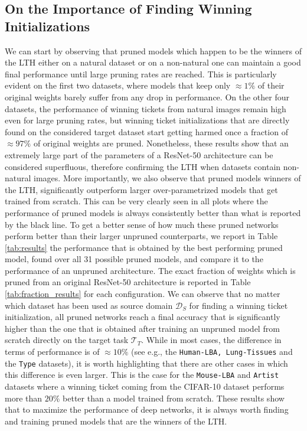 \subsection{On the Importance of Finding Winning Initializations}
We can start by observing that pruned models which happen to be the winners of the LTH either on a natural dataset or on a non-natural one can maintain a good final performance until large pruning rates are reached. This is particularly evident on the first two datasets, where models that keep only $\approx 1\%$ of their original weights barely suffer from any drop in performance. %
On the other four datasets, the performance of winning tickets from natural images remain high even for large pruning rates, but winning ticket initializations that are directly found on the considered target dataset start getting harmed once a fraction of $\approx 97\%$ of original weights are pruned. Nonetheless, these results show that an extremely large part of the parameters of a ResNet-50 architecture can be considered superfluous, therefore confirming the LTH when datasets contain non-natural images. More importantly, we also observe that pruned models winners of the LTH, significantly outperform larger over-parametrized models that get trained from scratch. This can be very clearly seen in all plots where the performance of pruned models is always consistently better than what is reported by the black line. To get a better sense of how much these pruned networks perform better than their larger unpruned counterparts, we report in Table \ref{tab:results} the performance that is obtained by the best performing pruned model, found over all 31 possible pruned models, and compare it to the performance of an unpruned architecture. The exact fraction of weights which is pruned from an original ResNet-50 architecture is reported in Table \ref{tab:fraction_results} for each configuration. We can observe that no matter which dataset has been used as source domain $\mathcal{D}_S$ for finding a winning ticket initialization, all pruned networks reach a final accuracy that is significantly higher than the one that is obtained after training an unpruned model from scratch directly on the target task $\mathcal{T}_T$. While in most cases, the difference in terms of performance is of $\approx 10\%$ (see e.g., the \texttt{Human-LBA, Lung-Tissues} and the \texttt{Type} datasets), it is worth highlighting that there are other cases in which this difference is even larger. This is the case for the \texttt{Mouse-LBA} and \texttt{Artist}  datasets where a winning ticket coming from the CIFAR-10 dataset performs more than $20\%$ better than a model trained from scratch. These results show that to maximize the performance of deep networks, it is always worth finding and training pruned models that are the winners of the LTH.

